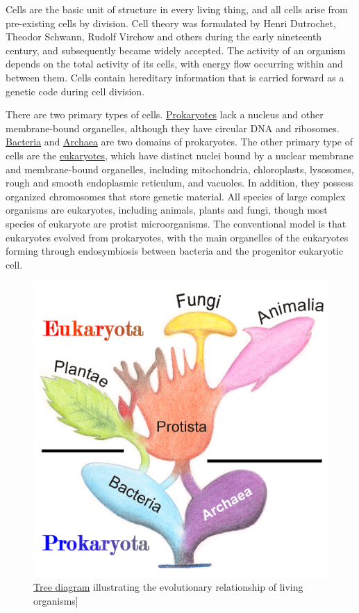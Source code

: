 Cells are the basic unit of structure in every living thing, and all cells arise from pre-existing cells by division. Cell theory was formulated by Henri Dutrochet, Theodor Schwann, Rudolf Virchow and others during the early nineteenth century, and subsequently became widely accepted. The activity of an organism depends on the total activity of its cells, with energy flow occurring within and between them. Cells contain hereditary information that is carried forward as a genetic code during cell division.

There are two primary types of cells. \href{https://en.wikipedia.org/wiki/Prokaryote}{Prokaryotes} lack a nucleus and other membrane-bound organelles, although they have circular DNA and ribosomes. \href{https://en.wikipedia.org/wiki/Bacteria}{Bacteria} and \href{https://en.wikipedia.org/wiki/Archaea}{Archaea} are two domains of prokaryotes. The other primary type of cells are the \href{https://en.wikipedia.org/wiki/Eukaryote}{eukaryotes}, which have distinct nuclei bound by a nuclear membrane and membrane-bound organelles, including mitochondria, chloroplasts, lysosomes, rough and smooth endoplasmic reticulum, and vacuoles. In addition, they possess organized chromosomes that store genetic material. All species of large complex organisms are eukaryotes, including animals, plants and fungi, though most species of eukaryote are protist microorganisms. The conventional model is that eukaryotes evolved from prokaryotes, with the main organelles of the eukaryotes forming through endosymbiosis between bacteria and the progenitor eukaryotic cell.



\begin{figure}

{\centering \includegraphics[width=0.7\linewidth]{./figures/life/Tree_of_Living_Organisms_2} 

}

\caption{\href{https://commons.wikimedia.org/wiki/File:Tree_of_Living_Organisms_2.png}{Tree diagram} illustrating the evolutionary relationship of living organisms{]}}\label{fig:livorgtree}
\end{figure}

